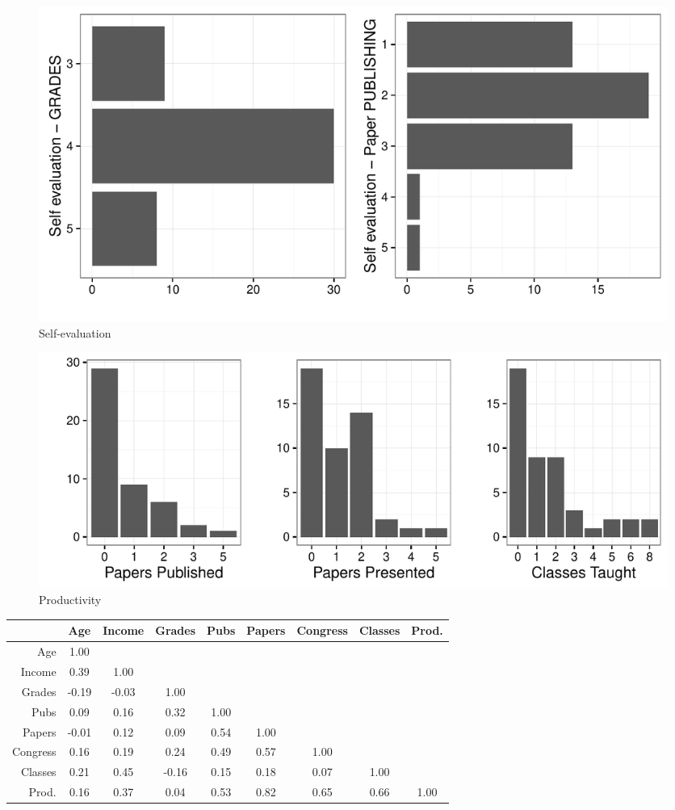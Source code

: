 \documentclass[a4paper, 12pt, openright, oneside, article, german, french, brazil, english]{abntex2}
\begin{document}
\begin{figure}[hbt]
	\centering
	\caption{Self-evaluation}
	\label{self-evaluation}
	\includegraphics[scale=0.6]{autoavaliacoes.pdf}
\end{figure}


\begin{figure}[ht]
	\centering
	\caption{Productivity}
	\label{productivity}
	\includegraphics[scale=0.7]{pub_con_classes.pdf}
\end{figure}

\begin{table}[ht]
	{\begin{tabular}{r|cccccccc}
		\hline
		& Age & Income & Grades & Pubs & Papers & Congress & Classes & Prod. \\ 
		\hline
		Age & 1.00 &  &  &  &  &  &  &  \\ 
		Income & 0.39 & 1.00 &  &  &  &  &  &  \\ 
		Grades & -0.19 & -0.03 & 1.00 &  &  &  &  &  \\ 
		Pubs & 0.09 & 0.16 & 0.32 & 1.00 &  &  &  &  \\ 
		Papers & -0.01 & 0.12 & 0.09 & 0.54 & 1.00 &  &  &  \\ 
		Congress & 0.16 & 0.19 & 0.24 & 0.49 & 0.57 & 1.00 &  &  \\ 
		Classes & 0.21 & 0.45 & -0.16 & 0.15 & 0.18 & 0.07 & 1.00 &  \\ 
		Prod. & 0.16 & 0.37 & 0.04 & 0.53 & 0.82 & 0.65 & 0.66 & 1.00 \\ 
		\hline
	\end{tabular}
}
	{}
\end{table}
\end{document}
